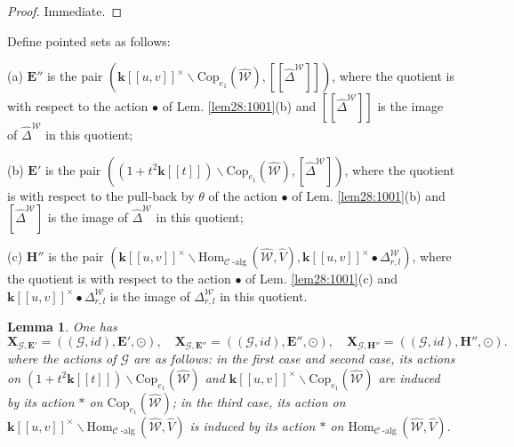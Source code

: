 \documentclass[10pt]{amsart}
\newtheorem{lem}[thm]{Lemma}
\numberwithin{equation}{subsection}
\begin{document}
\begin{proof}
    Immediate. 
\end{proof}



\begin{defn}\label{def:E':E'':H''}
Define pointed sets as follows: 

(a) $\mathbf E''$ is the pair $(\mathbf k[[u,v]]^\times\backslash\mathrm{Cop}_{e_1}(\hat{\mathcal W}),[\!\![\hat\Delta^{\mathcal W}]\!\!])$, where 
the quotient is with respect to the action $\bullet$ of Lem. \ref{lem28:1001}(b) and $[\!\![\hat\Delta^{\mathcal W}]\!\!]$ is the image of 
$\hat\Delta^{\mathcal W}$ in this quotient; 

(b) $\mathbf E'$ is the pair $((1+t^2\mathbf k[[t]])\backslash\mathrm{Cop}_{e_1}(\hat{\mathcal W}),[\hat\Delta^{\mathcal W}])$, where 
the quotient is with respect to the pull-back by $\theta$ of the action $\bullet$ of Lem. \ref{lem28:1001}(b) and $[\hat\Delta^{\mathcal W}]$ is the image of 
$\hat\Delta^{\mathcal W}$ in this quotient; 

(c) $\mathbf H''$ is the pair $(\mathbf k[[u,v]]^\times\backslash\mathrm{Hom}_{\mathcal C\operatorname{-alg}}(\hat{\mathcal W},\hat V),\mathbf k[[u,v]]^\times\bullet\Delta^{\mathcal W}_{r,l}
)$, where  
the quotient is with respect to the action $\bullet$ of Lem. \ref{lem28:1001}(c) and 
$\mathbf k[[u,v]]^\times\bullet\Delta^{\mathcal W}_{r,l}
$ is the image of 
$\Delta^{\mathcal W}_{r,l}$ in this quotient. 
\end{defn}




\begin{lem}\label{lem:3101009:BIS}
One has 
$$
\mathbf X_{\mathcal G,\mathbf{E'}}=((\mathcal G,id),\mathbf{E'},\odot), \quad 
 \mathbf X_{\mathcal G,\mathbf{E''}}=((\mathcal G,id),\mathbf{E''},\odot), \quad 
\mathbf X_{\mathcal G,\mathbf{H''}}=((\mathcal G,id),\mathbf{H''},\odot).  
$$
where the actions of $\mathcal G$ are as follows: 
in the first case and second case, its actions on $(1+t^2\mathbf k[[t]])\backslash\mathrm{Cop}_{e_1}(\hat{\mathcal W})$
and $\mathbf k[[u,v]]^\times\backslash\mathrm{Cop}_{e_1}(\hat{\mathcal W})$ are induced by its action $*$ on $\mathrm{Cop}_{e_1}(\hat{\mathcal W})$; 
in the third case, its action on $\mathbf k[[u,v]]^\times\backslash\mathrm{Hom}_{\mathcal C\operatorname{-alg}}(\hat{\mathcal W},\hat V)$
is induced by its action $*$ on $\mathrm{Hom}_{\mathcal C\operatorname{-alg}}(\hat{\mathcal W},\hat V)$. 
\end{lem}
\end{document}
